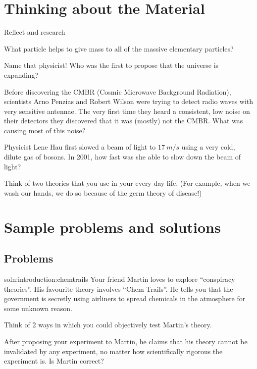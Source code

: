 \section{Thinking about the Material}
\vspace{0.5cm}
\begin{chapteractivity}{Reflect and research}
{
\item What particle helps to give mass to all of the massive elementary particles?
\item Name that physicist! Who was the first to propose that the universe is expanding?
\item Before discovering the CMBR (Cosmic Microwave Background Radiation), scientists Arno Penzias and Robert Wilson were trying to detect radio waves with very sensitive antennae. The very first time they heard a consistent, low noise on their detectors they discovered that it was (mostly) not the CMBR. What was causing most of this noise?
\item Physicist Lene Hau first slowed a beam of light to $\SI{17}{m/s}$ using a very cold, dilute gas of bosons. In 2001, how fast was she able to slow down the beam of light?
\item Think of two theories that you use in your every day life. (For example, when we wash our hands, we do so because of the germ theory of disease!)
}
\end{chapteractivity}

\newpage
\section{Sample problems and solutions}
\subsection{Problems}
\begin{problemParts}{soln:introduction:chemtrails}{\label{prob:introduction:chemtrails} Your friend Martin loves to explore ``conspiracy theories''. His favourite theory involves ``Chem Trails''. He tells you that the government is secretly using airliners to spread chemicals in the atmosphere for some unknown reason.}
\item Think of 2 ways in which you could objectively test Martin's theory.
\item After proposing your experiment to Martin, he claims that his theory cannot be invalidated by any experiment, no matter how scientifically rigorous the experiment is. Is Martin correct?
\end{problemParts}
\newpage

